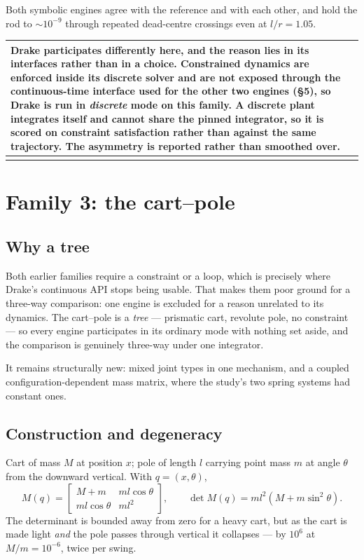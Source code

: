\documentclass[11pt,a4paper]{article}
\makeatletter
\newenvironment{callout}
  {\par\medskip\noindent\begin{tabular}{@{}p{0.94\textwidth}@{}}
   \arrayrulecolor{warnrule}\hline\rule{0pt}{2.6ex}}
  {\\[0.8ex]\hline\arrayrulecolor{black}\end{tabular}\par\medskip}
\makeatother
\begin{document}
\noindent Both symbolic engines agree with the reference and with each other,
and hold the rod to $\sim10^{-9}$ through repeated dead-centre crossings even
at $l/r = 1.05$.

\begin{callout}
\textbf{Drake participates differently here, and the reason lies in its
interfaces rather than in a choice.} Constrained dynamics are enforced inside
its discrete solver and are not exposed through the continuous-time interface
used for the other two engines (\S5), so Drake is run in \emph{discrete} mode
on this family. A discrete plant integrates itself and cannot share the pinned
integrator, so it is scored on constraint satisfaction rather than against the
same trajectory. The asymmetry is reported rather than smoothed over.
\end{callout}

\section{Family 3: the cart--pole}

\subsection{Why a tree}

Both earlier families require a constraint or a loop, which is precisely where
Drake's continuous API stops being usable. That makes them poor ground for a
three-way comparison: one engine is excluded for a reason unrelated to its
dynamics. The cart--pole is a \emph{tree} --- prismatic cart, revolute pole, no
constraint --- so every engine participates in its ordinary mode with nothing
set aside, and the comparison is genuinely three-way under one integrator.

It remains structurally new: mixed joint types in one mechanism, and a coupled
configuration-dependent mass matrix, where the study's two spring systems had
constant ones.

\subsection{Construction and degeneracy}

Cart of mass $M$ at position $x$; pole of length $l$ carrying point mass $m$ at
angle $\theta$ from the downward vertical. With $q = (x,\theta)$,
\begin{equation}
M(q) = \begin{bmatrix} M+m & ml\cos\theta \\ ml\cos\theta & ml^2\end{bmatrix},
\qquad
\det M(q) = ml^2\left(M + m\sin^2\theta\right).
\end{equation}
The determinant is bounded away from zero for a heavy cart, but as the cart is
made light \emph{and} the pole passes through vertical it collapses --- by
$10^{6}$ at $M/m = 10^{-6}$, twice per swing.
\end{document}

